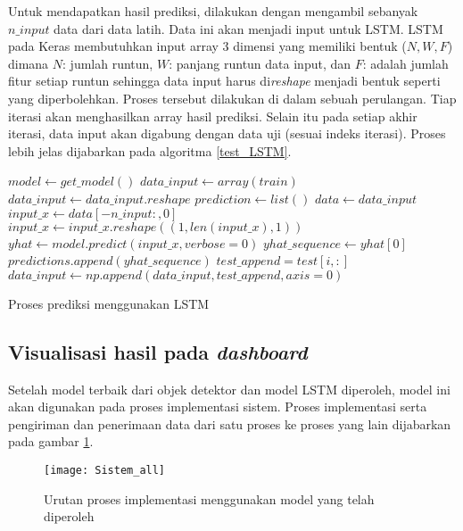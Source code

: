 \documentclass[../thesis.tex]{subfiles}
\begin{document}
Untuk mendapatkan hasil prediksi, dilakukan dengan mengambil sebanyak $n\_input$ data dari data latih. Data ini akan menjadi input untuk LSTM. LSTM pada Keras membutuhkan input array 3 dimensi yang memiliki bentuk ($N, W, F$) dimana $N$: jumlah runtun, $W$: panjang runtun data input, dan $F$: adalah jumlah fitur setiap runtun sehingga data input harus di\textit{reshape} menjadi bentuk seperti yang diperbolehkan.
Proses tersebut dilakukan di dalam sebuah perulangan. Tiap iterasi akan menghasilkan array hasil prediksi. Selain itu pada setiap akhir iterasi, data input akan digabung dengan data uji (sesuai indeks iterasi). Proses lebih jelas dijabarkan pada algoritma \ref{test_LSTM}.
\begin{algorithm}[htp]
	\begin{algorithmic}[1]
		\State $model \leftarrow get\_model()$
		\State $data\_input \leftarrow array(train)$
		\State $data\_input \leftarrow data\_input.reshape$
		\State $prediction \leftarrow list()$
			\State $data \leftarrow data\_input$
			\State $input\_x \leftarrow data[-n\_input:,0]$
			\State $input\_x \leftarrow input\_x.reshape((1, len(input\_x), 1))$
			\State $yhat \leftarrow model.predict(input\_x, verbose=0)$
			\State $yhat\_sequence \leftarrow yhat[0]$
			\State $predictions.append(yhat\_sequence)$
			\State $test\_append = test[i, :]$
			\State $data\_input \leftarrow np.append(data\_input, test\_append, axis=0)$
		\EndFor
	\EndFunction
	\end{algorithmic}
	\caption{Proses prediksi menggunakan LSTM}
	\label{test_LSTM}
\end{algorithm}

\subsection{Visualisasi hasil pada \textit{dashboard}}

Setelah model terbaik dari objek detektor dan model LSTM diperoleh, model ini akan digunakan pada proses implementasi sistem. Proses implementasi serta pengiriman dan penerimaan data dari satu proses ke proses yang lain dijabarkan pada gambar \ref{implementasi_sistem}.

\begin{figure}[htp]
	\centering
	\texttt{[image: Sistem\_all]}
	\caption{Urutan proses implementasi menggunakan model yang telah diperoleh}
	\label{implementasi_sistem}
\end{figure}
\end{document}
